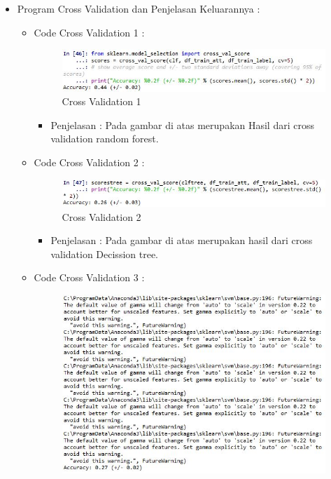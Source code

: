 \begin{enumerate}
\begin{itemize}
\begin{itemize}
\par
\par
\item Program Cross Validation dan Penjelasan Keluarannya :
\begin{itemize}
\item Code Cross Validation 1 :
\par
\begin{figure}[ht]
\centering
\includegraphics[scale=0.7]{figures/hmm/cod26.jpg}
\caption{Cross Validation 1}
\label{contoh}
\end{figure}
\par
\begin{itemize}
\item Penjelasan : Pada gambar di atas merupakan Hasil dari cross validation random forest.
\par 
\par
\end{itemize}
\item Code Cross Validation 2  :
\par
\begin{figure}[ht]
\centering
\includegraphics[scale=0.7]{figures/hmm/cod27.jpg}
\caption{Cross Validation 2}
\label{contoh}
\end{figure}
\par
\begin{itemize}
\item Penjelasan : Pada gambar di atas merupakan hasil dari cross validation Decission tree.
\par
\par
\end{itemize}
\item Code Cross Validation 3 :
\par
\begin{figure}[ht]
\centering
\includegraphics[scale=0.7]{figures/hmm/cod28.jpg}

\end{figure}
\end{itemize}
\end{itemize}
\end{itemize}
\end{enumerate}
